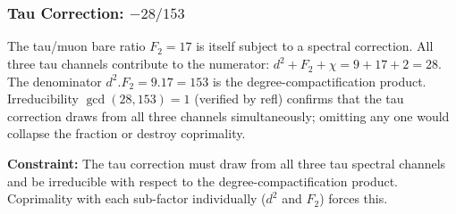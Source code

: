 \documentclass[11pt,a4paper]{book}
\def\cdot{.}%
\def\texttt#1{#1}%
\begin{document}
\begin{code}
\AgdaSymbol{)}\AgdaSpace{}%
\<%
\\
%
\>[2]\AgdaSpace{}%
\AgdaSpace{}%
\AgdaSpace{}%
\AgdaSpace{}%
\<%
\\
%
\>[2]\AgdaSymbol{(}\AgdaSpace{}%
\AgdaSpace{}%
\AgdaSymbol{)}\AgdaSpace{}%
\AgdaSpace{}%
\AgdaSymbol{(}\AgdaSpace{}%
\AgdaSpace{}%
\AgdaSpace{}%
\AgdaSpace{}%
\AgdaOperator{\AgdaPrimitive{*}}\AgdaSpace{}%
\AgdaSymbol{)}\<%
\\
\>[0]\AgdaSpace{}%
\AgdaSymbol{=}\AgdaSpace{}%
\<%
\\
%
\\[\AgdaEmptyExtraSkip]%
\>[0]\<%
\\
\>[0]\AgdaSpace{}%
\AgdaSymbol{:}\AgdaSpace{}%
\<%
\\
\>[0]\AgdaSpace{}%
\AgdaSymbol{=}\AgdaSpace{}%
\<%
\end{code}

\subsubsection*{Tau Correction: $-28/153$}

The tau/muon bare ratio $F_2 = 17$ is itself subject to a spectral correction.
All three tau channels contribute to the numerator: $d^2 + F_2 + \chi = 9 + 17 + 2 = 28$.
The denominator $d^2 \cdot F_2 = 9 \cdot 17 = 153$ is the degree-compactification
product.  Irreducibility $\gcd(28, 153) = 1$ (verified by \texttt{refl}) confirms
that the tau correction draws from all three channels simultaneously; omitting any
one would collapse the fraction or destroy coprimality.

\medskip
\noindent
\textbf{Constraint:}
The tau correction must draw from all three tau spectral channels and be irreducible
with respect to the degree-compactification product.  Coprimality with each sub-factor
individually ($d^2$ and $F_2$) forces this.
\end{document}
